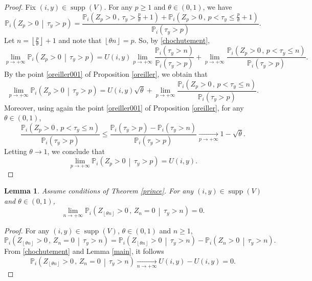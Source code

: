 \documentclass[12pt]{amsart}
\newtheorem{lemma}[theorem]{Lemma}
\theoremstyle{definition}
\numberwithin{equation}{section}
\newcommand*{\pent}[1]{\left\lfloor#1\right\rfloor}
\newcommand*{\sachant}[2]{\left.#1 \,\middle|\,#2\right.}
\def\bb#1{\mathbb{#1}}
\def\geq{\geqslant}
\def\leq{\leqslant}
\DeclareMathOperator{\supp}{supp}
\begin{document}
\begin{proof}
Fix $(i,y) \in \supp (V)$. For any $p \geq 1$ and $\theta \in (0,1)$, we have
\[
\bb P_i \left( \sachant{ Z_p > 0 }{ \tau_y > p } \right)  = \frac{\bb P_i \left( Z_p > 0 \,,\, \tau_y > \frac{p}{\theta}+1 \right) + \bb P_i \left( Z_p > 0 \,,\, p < \tau_y \leq \frac{p}{\theta}+1 \right) }{\bb P_i \left( \tau_y > p \right)}.
\]
Let $n = \pent{\frac{p}{\theta}}+1$ and note that $\pent{\theta n} = p$. So, by \eqref{chochutement},
\[
\lim_{p\to+\infty} \bb P_i \left( \sachant{ Z_p > 0 }{ \tau_y > p } \right)  = U(i,y) \lim_{p\to+\infty} \frac{\bb P_i \left( \tau_y > n \right)}{\bb P_i \left( \tau_y > p \right)} + \lim_{p\to+\infty} \frac{\bb P_i \left( Z_p > 0 \,,\, p < \tau_y \leq n \right) }{\bb P_i \left( \tau_y > p \right)}.
\]
By the point \ref{oreiller001} of Proposition \ref{oreiller}, we obtain that
\[
\lim_{p\to+\infty} \bb P_i \left( \sachant{ Z_p > 0 }{ \tau_y > p } \right)  = U(i,y) \sqrt{\theta} + \lim_{p\to+\infty} \frac{\bb P_i \left( Z_p > 0 \,,\, p < \tau_y \leq n \right) }{\bb P_i \left( \tau_y > p \right)}.
\]
Moreover, using again the point \ref{oreiller001} of Proposition \ref{oreiller}, for any $\theta \in (0,1)$,
\[
\frac{\bb P_i \left( Z_p > 0 \,,\, p < \tau_y \leq n \right) }{\bb P_i \left( \tau_y > p \right)} \leq \frac{\bb P_i \left( \tau_y > p \right) - \bb P_i \left( \tau_y > n \right) }{\bb P_i \left( \tau_y > p \right)} \underset{p\to +\infty}{\longrightarrow} 1-\sqrt{\theta}.
\]
Letting $\theta \to 1$, we conclude that
\[
\lim_{p\to+\infty} \bb P_i \left( \sachant{ Z_p > 0 }{ \tau_y > p } \right)  = U(i,y).
\]
\end{proof}

\begin{lemma}
Assume conditions of Theorem \ref{prince}.
\label{chapeau}
For any $(i,y) \in \supp (V)$ and $\theta \in (0,1)$,
\[
\lim_{n\to+\infty} \bb P_i \left( \sachant{ Z_{\pent{\theta n}} > 0 \,,\, Z_n = 0 }{ \tau_y > n } \right) = 0.
\]
\end{lemma}

\begin{proof}
For any $(i,y) \in \supp (V)$, $\theta \in (0,1)$ and $n \geq 1$,
\[
\bb P_i \left( \sachant{ Z_{\pent{\theta n}} > 0 \,,\, Z_n = 0 }{ \tau_y > n } \right) = \bb P_i \left( \sachant{ Z_{\pent{\theta n}} > 0 }{ \tau_y > n } \right) - \bb P_i \left( \sachant{ Z_n > 0 }{ \tau_y > n } \right).
\]
From \eqref{chochutement} and Lemma \ref{main}, it follows
\[
\bb P_i \left( \sachant{ Z_{\pent{\theta n}} > 0 \,,\, Z_n = 0 }{ \tau_y > n } \right) \underset{n\to+\infty}{\longrightarrow} U(i,y) - U(i,y) = 0.
\]
\end{proof}
\end{document}
